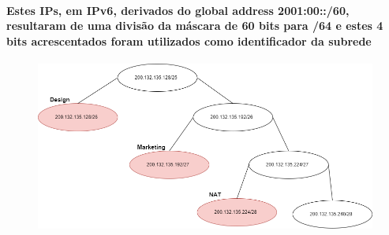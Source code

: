 \documentclass{report}
\begin{document}
\paragraph{Estes IPs, em IPv6, derivados do global address 2001:00::/60, resultaram de uma divisão da máscara de 60 bits para /64 e estes 4 bits acrescentados foram utilizados como identificador da subrede}


\begin{center}
\begin{figure}
    \centering
    \includegraphics[scale=0.5]{IPsPublicosDiagrama.png}
\end{figure}    
\end{center}
\end{document}

